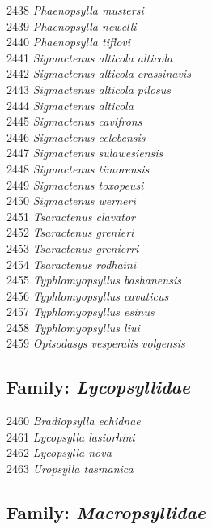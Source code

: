 \documentclass[
]{article}
\begin{document}
2438 \emph{Phaenopsylla mustersi}\\
2439 \emph{Phaenopsylla newelli}\\
2440 \emph{Phaenopsylla tiflovi}\\
2441 \emph{Sigmactenus alticola alticola}\\
2442 \emph{Sigmactenus alticola crassinavis}\\
2443 \emph{Sigmactenus alticola pilosus}\\
2444 \emph{Sigmactenus alticola}\\
2445 \emph{Sigmactenus cavifrons}\\
2446 \emph{Sigmactenus celebensis}\\
2447 \emph{Sigmactenus sulawesiensis}\\
2448 \emph{Sigmactenus timorensis}\\
2449 \emph{Sigmactenus toxopeusi}\\
2450 \emph{Sigmactenus werneri}\\
2451 \emph{Tsaractenus clavator}\\
2452 \emph{Tsaractenus grenieri}\\
2453 \emph{Tsaractenus grenierri}\\
2454 \emph{Tsaractenus rodhaini}\\
2455 \emph{Typhlomyopsyllus bashanensis}\\
2456 \emph{Typhlomyopsyllus cavaticus}\\
2457 \emph{Typhlomyopsyllus esinus}\\
2458 \emph{Typhlomyopsyllus liui}\\
2459 \emph{Opisodasys vesperalis volgensis}

\hypertarget{family-lycopsyllidae}{%
\subsection{\texorpdfstring{Family:
\emph{Lycopsyllidae}}{Family: Lycopsyllidae}}\label{family-lycopsyllidae}}

2460 \emph{Bradiopsylla echidnae}\\
2461 \emph{Lycopsylla lasiorhini}\\
2462 \emph{Lycopsylla nova}\\
2463 \emph{Uropsylla tasmanica}

\hypertarget{family-macropsyllidae}{%
\subsection{\texorpdfstring{Family:
\emph{Macropsyllidae}}{Family: Macropsyllidae}}\label{family-macropsyllidae}}
\end{document}
